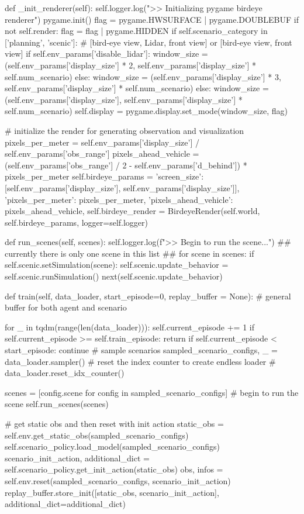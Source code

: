 \begin{appendix}
def \_init\_renderer(self):
self.logger.log(">> Initializing pygame birdeye renderer")
pygame.init()
flag = pygame.HWSURFACE | pygame.DOUBLEBUF
if not self.render:
flag = flag | pygame.HIDDEN
if self.scenario\_category in ['planning', 'scenic']: 
\# [bird-eye view, Lidar, front view] or [bird-eye view, front view]
if self.env\_params['disable\_lidar']:
window\_size = (self.env\_params['display\_size'] * 2, self.env\_params['display\_size'] * self.num\_scenario)
else:
window\_size = (self.env\_params['display\_size'] * 3, self.env\_params['display\_size'] * self.num\_scenario)
else:
window\_size = (self.env\_params['display\_size'], self.env\_params['display\_size'] * self.num\_scenario)
self.display = pygame.display.set\_mode(window\_size, flag)

\# initialize the render for generating observation and visualization
pixels\_per\_meter = self.env\_params['display\_size'] / self.env\_params['obs\_range']
pixels\_ahead\_vehicle = (self.env\_params['obs\_range'] / 2 - self.env\_params['d\_behind']) * pixels\_per\_meter
self.birdeye\_params = {
	'screen\_size': [self.env\_params['display\_size'], self.env\_params['display\_size']],
	'pixels\_per\_meter': pixels\_per\_meter,
	'pixels\_ahead\_vehicle': pixels\_ahead\_vehicle,
}
self.birdeye\_render = BirdeyeRender(self.world, self.birdeye\_params, logger=self.logger)

def run\_scenes(self, scenes):
self.logger.log(f">> Begin to run the scene...")
\#\# currently there is only one scene in this list \#\#
for scene in scenes:
if self.scenic.setSimulation(scene):
self.scenic.update\_behavior = self.scenic.runSimulation()
next(self.scenic.update\_behavior)

def train(self, data\_loader, start\_episode=0, replay\_buffer = None):
\# general buffer for both agent and scenario

for \_ in tqdm(range(len(data\_loader))):
self.current\_episode += 1
if self.current\_episode >= self.train\_episode:
return
if self.current\_episode < start\_episode:
continue
\# sample scenarios
sampled\_scenario\_configs, \_ = data\_loader.sampler()
\# reset the index counter to create endless loader
\# data\_loader.reset\_idx\_counter()

scenes = [config.scene for config in sampled\_scenario\_configs]
\# begin to run the scene
self.run\_scenes(scenes)

\# get static obs and then reset with init action 
static\_obs = self.env.get\_static\_obs(sampled\_scenario\_configs)
self.scenario\_policy.load\_model(sampled\_scenario\_configs)
scenario\_init\_action, additional\_dict = self.scenario\_policy.get\_init\_action(static\_obs)
obs, infos = self.env.reset(sampled\_scenario\_configs, scenario\_init\_action)
replay\_buffer.store\_init([static\_obs, scenario\_init\_action], additional\_dict=additional\_dict)


\end{appendix}
